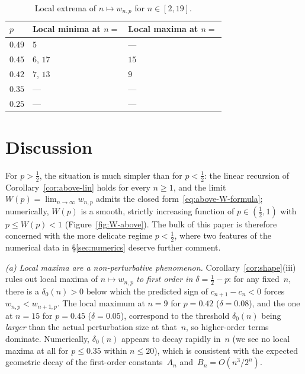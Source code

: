 \documentclass[12pt]{article}
\theoremstyle{definition}
\theoremstyle{remark}
\begin{document}
\begin{table}[h]
\centering
\begin{tabular}{lll}
\toprule
$p$ & Local minima at $n=$ & Local maxima at $n=$ \\
\midrule
$0.49$ & $5$ & --- \\
$0.45$ & $6$, $17$ & $15$ \\
$0.42$ & $7$, $13$ & $9$ \\
$0.35$ & --- & --- \\
$0.25$ & --- & --- \\
\bottomrule
\end{tabular}
\caption{Local extrema of $n\mapsto w_{n,p}$ for
  $n\in[2,19]$.}\label{tab:extrema}
\end{table}

\section{Discussion}\label{sec:discussion}

For $p>\tfrac12$, the situation is much simpler than for
$p<\tfrac12$: the linear recursion of
Corollary~\ref{cor:above-lin} holds for every $n\ge 1$, and the
limit $W(p)=\lim_{n\to\infty}w_{n,p}$ admits the closed
form~\eqref{eq:above-W-formula}; numerically, $W(p)$ is a
smooth, strictly increasing function of $p\in(\tfrac12,1)$ with
$p\le W(p)<1$ (Figure~\ref{fig:W-above}).  The bulk of this
paper is therefore concerned with the more delicate regime
$p<\tfrac12$, where two features of the numerical data in
\S\ref{sec:numerics} deserve further comment.

\emph{(a) Local maxima are a non-perturbative phenomenon.}
Corollary~\ref{cor:shape}(iii) rules out local maxima of
$n\mapsto w_{n,p}$ \emph{to first order in $\delta=\tfrac12-p$}:
for any fixed~$n$, there is a $\delta_0(n)>0$ below which the
predicted sign of $c_{n+1}-c_n<0$ forces~$w_{n,p}<w_{n+1,p}$.
The local maximum at $n=9$ for $p=0.42$ ($\delta=0.08$), and the
one at $n=15$ for $p=0.45$ ($\delta=0.05$), correspond to the
threshold $\delta_0(n)$ being \emph{larger} than the actual
perturbation size at that~$n$, so higher-order terms dominate.
Numerically, $\delta_0(n)$ appears to decay rapidly in~$n$ (we
see no local maxima at all for $p\le 0.35$ within $n\le 20$),
which is consistent with the expected geometric decay of the
first-order constants~$A_n$ and~$B_n=O(n^3/2^n)$.
\end{document}
